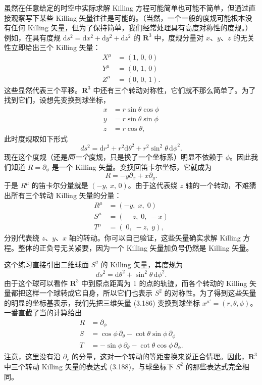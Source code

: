 虽然在任意给定的时空中实际求解 Killing 方程可能简单也可能不简单，但通过直接观察写下某些 Killing 矢量往往是可能的。（当然，一个一般的度规可能根本没有任何 Killing 矢量，但为了保持简单，我们经常处理具有高度对称性的度规。）例如，在具有度规 $\mathrm{d}s^2 = \mathrm{d}x^2 + \mathrm{d}y^2 + \mathrm{d}z^2$ 的 $\mathbf{R}^3$ 中，度规分量对 $x$、$y$、$z$ 的无关性立即给出三个 Killing 矢量：
\begin{align*}
X^\mu &= (1,\, 0,\, 0)\\
Y^\mu &= (0,\, 1,\, 0)\\
Z^\mu &= (0,\, 0,\, 1).
\tag{3.182}
\end{align*}
这些显然代表三个平移。$\mathbf{R}^3$ 中还有三个转动对称性，它们就不那么简单了。为了找到它们，设想先变换到球坐标，
\begin{align*}
x &= r\sin\theta\cos\phi\\
y &= r\sin\theta\sin\phi\\
z &= r\cos\theta,
\tag{3.183}
\end{align*}
此时度规取如下形式
\begin{equation*}
ds^2 = \mathrm{d}r^2 + r^2\mathrm{d}\theta^2 + r^2\sin^2\theta\,\mathrm{d}\phi^2.
\tag{3.184}
\end{equation*}
现在这个度规（还是\emph{同一个}度规，只是换了一个坐标系）明显不依赖于 $\phi$。因此我们知道 $R = \partial_\phi$ 是一个 Killing 矢量。变换回笛卡尔坐标，它就成为
\begin{equation*}
R = -y\partial_x + x\partial_y.
\tag{3.185}
\end{equation*}
于是 $R^\mu$ 的笛卡尔分量就是 $(-y,\, x,\, 0)$。由于这代表绕 $z$ 轴的一个转动，不难猜出所有三个转动 Killing 矢量的分量：
\begin{align*}
R^\mu &= (-y,\; x,\; 0)\\
S^\mu &= (\phantom{-}z,\; 0,\; -x)\\
T^\mu &= (\;0,\; -z,\; y),
\tag{3.186}
\end{align*}
分别代表绕 $z$、$y$、$x$ 轴的转动。你可以自己验证，这些矢量确实求解 Killing 方程。整体的正负号无关紧要，因为一个 Killing 矢量加负号仍然是 Killing 矢量。

这个练习直接引出二维球面 $S^2$ 的 Killing 矢量，其度规为
\begin{equation*}
ds^2 = \mathrm{d}\theta^2 + \sin^2\theta\,\mathrm{d}\phi^2.
\tag{3.187}
\end{equation*}
由于这个球可以看作 $\mathbf{R}^3$ 中到原点距离为 1 的点的轨迹，而各个转动的 Killing 矢量都把这样一个球转成它自身，所以它们也表示 $S^2$ 的对称性。为了得到这些矢量的明显的坐标基表示，我们先把三维矢量 (3.186) 变换到球坐标 $x^{\mu'} = (r, \theta, \phi)$。一番直截了当的计算给出
\begin{align*}
R &= \partial_\phi\\
S &= \cos\phi\,\partial_\theta - \cot\theta\sin\phi\,\partial_\phi\\
T &= -\sin\phi\,\partial_\theta - \cot\theta\cos\phi\,\partial_\phi.
\tag{3.188}
\end{align*}
注意，这里没有沿 $\partial_r$ 的分量，这对一个转动的等距变换来说正合情理。因此，$\mathbf{R}^3$ 中三个转动 Killing 矢量的表达式 (3.188)，与球坐标下 $S^2$ 的那些表达式完全相同。

